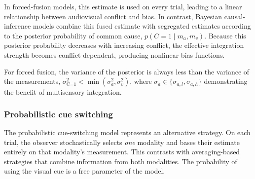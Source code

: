 \documentclass{jov}
\begin{document}
In forced-fusion models, this estimate is used on every trial, leading to a linear relationship between audiovisual conflict and bias. In contrast, Bayesian causal-inference models combine this fused estimate with segregated estimates according to the posterior probability of common cause, $p(C=1 \mid m_a,m_v)$. Because this posterior probability decreases with increasing conflict, the effective integration strength becomes conflict-dependent, producing nonlinear bias functions.

For forced fusion, the variance of the posterior is always less than the variance of the measurements, $\sigma_{\text{C=1}}^2 < \min(\sigma_a^2, \sigma_v^2)$, where $\sigma_a \in \{\sigma_{a,l}, \sigma_{a,h}\}$ demonstrating the benefit of multisensory integration.

\subsubsection{Probabilistic cue switching}

The probabilistic cue-switching model represents an alternative strategy. On each trial, the observer stochastically selects \textit{one} modality and bases their estimate entirely on that modality's measurement. This contrasts with averaging-based strategies that combine information from both modalities. The probability of using the visual cue is a free parameter of the model. 



\end{document}
